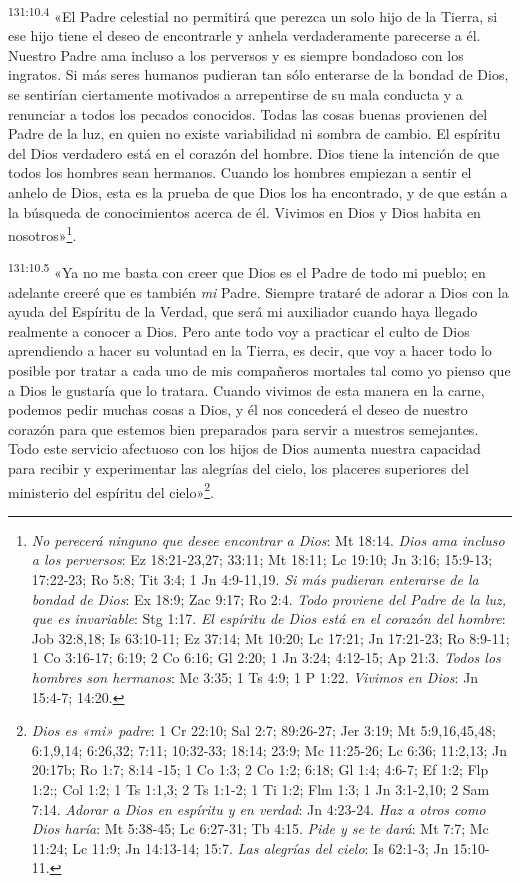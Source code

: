 \par 
\textsuperscript{131:10.4} «El Padre celestial no permitirá que perezca un solo hijo de la Tierra, si ese hijo tiene el deseo de encontrarle y anhela verdaderamente parecerse a él. Nuestro Padre ama incluso a los perversos y es siempre bondadoso con los ingratos. Si más seres humanos pudieran tan sólo enterarse de la bondad de Dios, se sentirían ciertamente motivados a arrepentirse de su mala conducta y a renunciar a todos los pecados conocidos. Todas las cosas buenas provienen del Padre de la luz, en quien no existe variabilidad ni sombra de cambio. El espíritu del Dios verdadero está en el corazón del hombre. Dios tiene la intención de que todos los hombres sean hermanos. Cuando los hombres empiezan a sentir el anhelo de Dios, esta es la prueba de que Dios los ha encontrado, y de que están a la búsqueda de conocimientos acerca de él. Vivimos en Dios y Dios habita en nosotros»\footnote{\textit{No perecerá ninguno que desee encontrar a Dios}: Mt 18:14. \textit{Dios ama incluso a los perversos}: Ez 18:21-23,27; 33:11; Mt 18:11; Lc 19:10; Jn 3:16; 15:9-13; 17:22-23; Ro 5:8; Tit 3:4; 1 Jn 4:9-11,19. \textit{Si más pudieran enterarse de la bondad de Dios}: Ex 18:9; Zac 9:17; Ro 2:4. \textit{Todo proviene del Padre de la luz, que es invariable}: Stg 1:17. \textit{El espíritu de Dios está en el corazón del hombre}: Job 32:8,18; Is 63:10-11; Ez 37:14; Mt 10:20; Lc 17:21; Jn 17:21-23; Ro 8:9-11; 1 Co 3:16-17; 6:19; 2 Co 6:16; Gl 2:20; 1 Jn 3:24; 4:12-15; Ap 21:3. \textit{Todos los hombres son hermanos}: Mc 3:35; 1 Ts 4:9; 1 P 1:22. \textit{Vivimos en Dios}: Jn 15:4-7; 14:20.}.

\par 
\textsuperscript{131:10.5} «Ya no me basta con creer que Dios es el Padre de todo mi pueblo; en adelante creeré que es también \textit{mi} Padre. Siempre trataré de adorar a Dios con la ayuda del Espíritu de la Verdad, que será mi auxiliador cuando haya llegado realmente a conocer a Dios. Pero ante todo voy a practicar el culto de Dios aprendiendo a hacer su voluntad en la Tierra, es decir, que voy a hacer todo lo posible por tratar a cada uno de mis compañeros mortales tal como yo pienso que a Dios le gustaría que lo tratara. Cuando vivimos de esta manera en la carne, podemos pedir muchas cosas a Dios, y él nos concederá el deseo de nuestro corazón para que estemos bien preparados para servir a nuestros semejantes. Todo este servicio afectuoso con los hijos de Dios aumenta nuestra capacidad para recibir y experimentar las alegrías del cielo, los placeres superiores del ministerio del espíritu del cielo»\footnote{\textit{Dios es «mi» padre}: 1 Cr 22:10; Sal 2:7; 89:26-27; Jer 3:19; Mt 5:9,16,45,48; 6:1,9,14; 6:26,32; 7:11; 10:32-33; 18:14; 23:9; Mc 11:25-26; Lc 6:36; 11:2,13; Jn 20:17b; Ro 1:7; 8:14 -15; 1 Co 1:3; 2 Co 1:2; 6:18; Gl 1:4; 4:6-7; Ef 1:2; Flp 1:2:; Col 1:2; 1 Ts 1:1,3; 2 Ts 1:1-2; 1 Ti 1:2; Flm 1:3; 1 Jn 3:1-2,10; 2 Sam 7:14. \textit{Adorar a Dios en espíritu y en verdad}: Jn 4:23-24. \textit{Haz a otros como Dios haría}: Mt 5:38-45; Lc 6:27-31; Tb 4:15. \textit{Pide y se te dará}: Mt 7:7; Mc 11:24; Lc 11:9; Jn 14:13-14; 15:7. \textit{Las alegrías del cielo}: Is 62:1-3; Jn 15:10-11.}.

